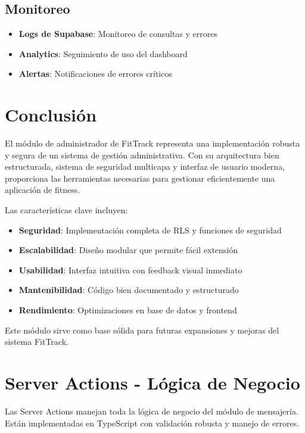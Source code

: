 \documentclass[12pt,a4paper]{article}
\begin{document}
\subsection{Monitoreo}

\begin{itemize}
  \item \textbf{Logs de Supabase}: Monitoreo de consultas y errores
  \item \textbf{Analytics}: Seguimiento de uso del dashboard
  \item \textbf{Alertas}: Notificaciones de errores críticos
\end{itemize}

\section{Conclusión}

El módulo de administrador de FitTrack representa una implementación robusta y segura de un sistema de gestión administrativa. Con su arquitectura bien estructurada, sistema de seguridad multicapa y interfaz de usuario moderna, proporciona las herramientas necesarias para gestionar eficientemente una aplicación de fitness.

Las características clave incluyen:

\begin{itemize}
  \item \textbf{Seguridad}: Implementación completa de RLS y funciones de seguridad
  \item \textbf{Escalabilidad}: Diseño modular que permite fácil extensión
  \item \textbf{Usabilidad}: Interfaz intuitiva con feedback visual inmediato
  \item \textbf{Mantenibilidad}: Código bien documentado y estructurado
  \item \textbf{Rendimiento}: Optimizaciones en base de datos y frontend
\end{itemize}

Este módulo sirve como base sólida para futuras expansiones y mejoras del sistema FitTrack.

\section{Server Actions - Lógica de Negocio}

Las Server Actions manejan toda la lógica de negocio del módulo de mensajería. Están implementadas en TypeScript con validación robusta y manejo de errores.
\end{document}
